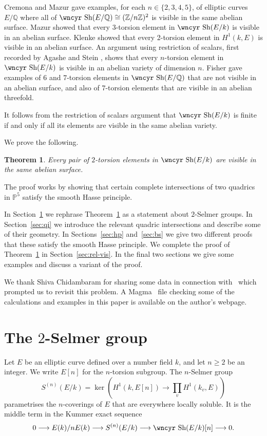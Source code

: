 \documentclass[12pt]{amsart}
\newcommand{\ra}{\longrightarrow}
\newcommand{\PP}{{\mathbb P}}
\newcommand{\Q}{{\mathbb Q}}
\newcommand{\Z}{{\mathbb Z}}
\newcommand{\isom}{\cong}
\newcommand{\Sha}{\mbox{\wncyr Sh}}
\newtheorem{Theorem}[Proposition]{Theorem}
\theoremstyle{definition}
\begin{document}
Cremona and Mazur \cite{CM, AS2} gave examples, for each
$n \in \{2,3,4,5 \}$, of elliptic curves $E/\Q$ where all of
$\Sha(E/\Q) \isom (\Z/n\Z)^2$ is visible in the same abelian surface.
Mazur \cite{Mazur} showed that every 3-torsion element in $\Sha(E/k)$
is visible in an abelian surface. Klenke \cite{Klenke} showed that
every 2-torsion element in $H^1(k,E)$ is visible in an abelian
surface. An argument using restriction of scalars, first recorded by
Agashe and Stein \cite{AS}, shows that every $n$-torsion element in
$\Sha(E/k)$ is visible in an abelian variety of dimension $n$. Fisher
\cite{invis, vis7} gave examples of $6$ and $7$-torsion elements in
$\Sha(E/\Q)$ that are not visible in an abelian surface, and also of
$7$-torsion elements that are visible in an abelian threefold.

It follows from the restriction of scalars argument that $\Sha(E/k)$
is finite if and only if all its elements are visible in the same
abelian variety.

We prove the following.

\begin{Theorem}
  \label{thm:main}
  Every pair of $2$-torsion elements in $\Sha(E/k)$ are visible in the
  same abelian surface.
\end{Theorem}

The proof works by showing that certain complete intersections of two
quadrics in $\PP^5$ satisfy the smooth Hasse principle.

In Section~\ref{sec:2sel} we rephrase Theorem~\ref{thm:main} as a
statement about $2$-Selmer groups. In Section~\ref{sec:qi} we
introduce the relevant quadric intersections and describe some of
their geometry.  In Sections~\ref{sec:hp} and~\ref{sec:bs} we give two
different proofs that these satisfy the smooth Hasse principle. We
complete the proof of Theorem~\ref{thm:main} in
Section~\ref{sec:rel-vis}. In the final two sections we give some
examples and discuss a variant of the proof.

We thank Shiva Chidambaram for sharing some data in connection
with~\cite{BCC} which prompted us to revisit this problem.  A
Magma~\cite{magma} file checking some of the calculations and examples
in this paper is available on the author's webpage.

\section{The $2$-Selmer group}
\label{sec:2sel}

Let $E$ be an elliptic curve defined over a number field $k$, and let
$n \geqslant 2$ be an integer. We write $E[n]$ for the $n$-torsion
subgroup. The $n$-Selmer group
\[ S^{(n)}(E/k) = \ker \left( H^1(k,E[n]) \to \prod_v H^1(k_v,E) \right) \]
parametrises the $n$-coverings of $E$ that are everywhere locally
soluble. It is the middle term in the Kummer exact sequence
\[ 0 \ra E(k)/nE(k) \ra  S^{(n)}(E/k) \ra \Sha(E/k)[n] \ra 0. \]
\end{document}

